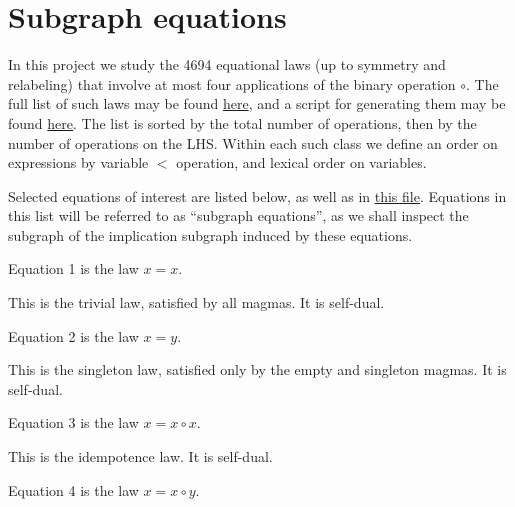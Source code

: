 \chapter{Subgraph equations}\label{subgraph-eq}

In this project we study the 4694 equational laws (up to symmetry and relabeling) that involve at most four applications of the binary operation $\circ$.  The full list of such laws may be found \href{https://github.com/teorth/equational_theories/blob/main/equational_theories/AllEquations.lean}{here}, and a script for generating them may be found \href{https://github.com/teorth/equational_theories/blob/main/scripts/generate_eqs_list.py}{here}.  The list is sorted by the total number of operations, then by the number of operations on the LHS. Within each such class we define an order on expressions by variable $<$ operation, and lexical order on variables.

Selected equations of interest are listed below, as well as in \href{https://github.com/teorth/equational_theories/blob/main/equational_theories/Equations.lean}{this file}.  Equations in this list will be referred to as ``subgraph equations'', as we shall inspect the subgraph of the implication subgraph induced by these equations.




\begin{definition}[Equation 1]\label{eq1}\leanok{}  Equation 1 is the law $x=x$.
\end{definition}

This is the trivial law, satisfied by all magmas. It is self-dual.


\begin{definition}[Equation 2]\label{eq2}\leanok{}  Equation 2 is the law $x=y$.
\end{definition}

This is the singleton law, satisfied only by the empty and singleton magmas.  It is self-dual.

\begin{definition}[Equation 3]\label{eq3}\leanok{}  Equation 3 is the law $x=x \circ x$.
\end{definition}

This is the idempotence law.  It is self-dual.

\begin{definition}[Equation 4]\label{eq4}\leanok{}  Equation 4 is the law $x=x \circ y$.
\end{definition}

